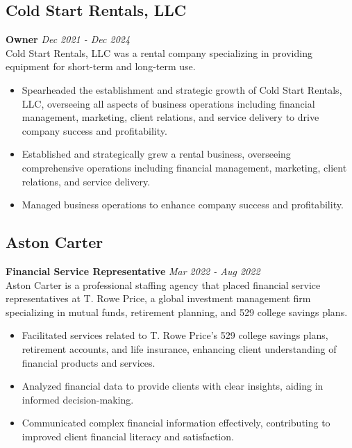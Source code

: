 \documentclass[a4paper,10pt]{article}
\begin{document}
\subsection{Cold Start Rentals, LLC}
\noindent\textbf{Owner} \hfill \textit{Dec 2021 - Dec 2024} \\
Cold Start Rentals, LLC was a rental company specializing in providing equipment for short-term and long-term use.
\begin{itemize}[leftmargin=*]
    \item Spearheaded the establishment and strategic growth of Cold Start Rentals, LLC, overseeing all aspects of business operations including financial management, marketing, client relations, and service delivery to drive company success and profitability.
    \item Established and strategically grew a rental business, overseeing comprehensive operations including financial
management, marketing, client relations, and service delivery.
    \item Managed business operations to enhance company success and profitability.
\end{itemize}

\subsection{Aston Carter}
\noindent\textbf{Financial Service Representative} \hfill \textit{Mar 2022 - Aug 2022} \\
Aston Carter is a professional staffing agency that placed financial service representatives at T. Rowe Price, a global
investment management firm specializing in mutual funds, retirement planning, and 529 college savings plans.
\begin{itemize}[leftmargin=*]
    \item Facilitated services related to T. Rowe Price’s 529 college savings plans, retirement accounts, and life insurance, enhancing client understanding of financial products and services.
    \item Analyzed financial data to provide clients with clear insights, aiding in informed decision-making.
    \item Communicated complex financial information effectively, contributing to improved client financial literacy and
    satisfaction.
    
\end{itemize}
\end{document}
